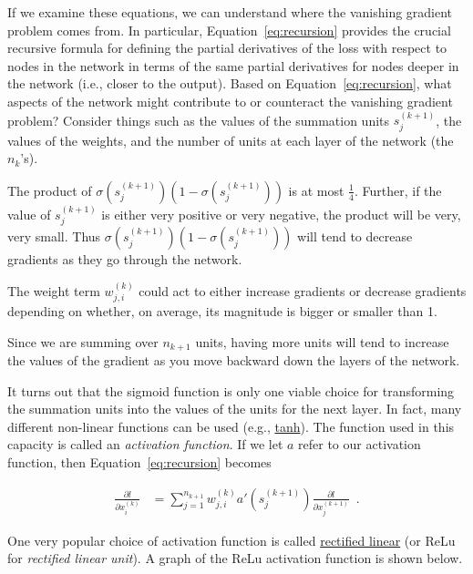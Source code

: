\documentclass[assignment07_Solutions]{subfiles}
\begin{document}
\begin{exercise}
\bes
\item If we examine these equations, we can understand where the vanishing gradient problem comes from.  In particular, Equation~\ref{eq:recursion} provides the crucial recursive formula for defining the partial derivatives of the loss with respect to nodes in the network in terms of the same partial derivatives for nodes deeper in the network (i.e., closer to the output).  Based on Equation~\ref{eq:recursion}, what aspects of the network might contribute to or counteract the vanishing gradient problem? Consider things such as the values of the summation units $s_j^{(k+1)}$, the values of the weights, and the number of units at each layer of the network (the $n_k$'s).

\begin{boxedsolution}
\bi
\item The product of $\sigma(s_j^{(k+1)})(1-\sigma(s_j^{(k+1)}))$ is at most $\frac{1}{4}$.  Further, if the value of $s_j^{(k+1)}$ is either very positive or very negative, the product will be very, very small.  Thus $\sigma(s_j^{(k+1)})(1-\sigma(s_j^{(k+1)}))$ will tend to decrease gradients as they go through the network.
\item The weight term $w_{j,i}^{(k)}$ could act to either increase gradients or decrease gradients depending on whether, on average, its magnitude is bigger or smaller than 1.
\item Since we are summing over $n_{k+1}$ units, having more units will tend to increase the values of the gradient as you move backward down the layers of the network.
\ei
\end{boxedsolution}

\item It turns out that the sigmoid function is only one viable choice for transforming the summation units into the values of the units for the next layer.  In fact, many different  non-linear functions can be used (e.g., \href{http://mathworld.wolfram.com/HyperbolicTangent.html}{tanh}).  The function used in this capacity is called an \emph{activation function}.  If we let $a$ refer to our activation function, then Equation~\ref{eq:recursion} becomes

\begin{align}
\frac{\partial l}{\partial x^{(k)}_i} &= \sum_{j=1}^{n_{k+1}} w^{(k)}_{j,i} a' \left ( s_{j}^{(k+1)} \right)  \frac{\partial l}{\partial x^{(k+1)}_j} \label{eq:recursion2} \enspace .
\end{align}


One very popular choice of activation function is called \href{https://en.wikipedia.org/wiki/Rectifier_(neural_networks)}{rectified linear} (or ReLu for \emph{rectified linear unit}).  A graph of the ReLu activation function is shown below.


\end{exercise}
\end{document}
